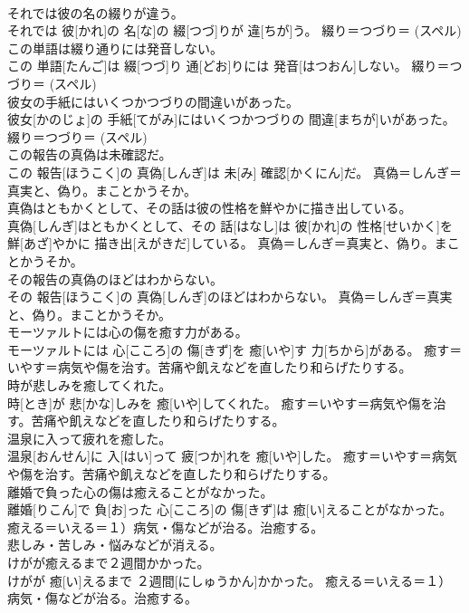 \documentclass[8pt]{extreport}
\begin{document}
\begin{CJK}{UTF8}{min}
{\\	それでは彼の名の綴りが違う。	
\\	それでは 彼[かれ]の 名[な]の 綴[つづ]りが 違[ちが]う。	綴り＝つづり＝ (スペル) 
\\	この単語は綴り通りには発音しない。	
\\	この 単語[たんご]は 綴[つづ]り 通[どお]りには 発音[はつおん]しない。	綴り＝つづり＝ (スペル) 
\\	彼女の手紙にはいくつかつづりの間違いがあった。	
\\	彼女[かのじょ]の 手紙[てがみ]にはいくつかつづりの 間違[まちが]いがあった。	綴り＝つづり＝ (スペル) 
\\	この報告の真偽は未確認だ。	
\\	この 報告[ほうこく]の 真偽[しんぎ]は 未[み] 確認[かくにん]だ。	真偽＝しんぎ＝真実と、偽り。まことかうそか。
\\	真偽はともかくとして、その話は彼の性格を鮮やかに描き出している。	
\\	真偽[しんぎ]はともかくとして、その 話[はなし]は 彼[かれ]の 性格[せいかく]を 鮮[あざ]やかに 描き出[えがきだ]している。	真偽＝しんぎ＝真実と、偽り。まことかうそか。
\\	その報告の真偽のほどはわからない。	
\\	その 報告[ほうこく]の 真偽[しんぎ]のほどはわからない。	真偽＝しんぎ＝真実と、偽り。まことかうそか。
\\	モーツァルトには心の傷を癒す力がある。	
\\	モーツァルトには 心[こころ]の 傷[きず]を 癒[いや]す 力[ちから]がある。	癒す＝いやす＝病気や傷を治す。苦痛や飢えなどを直したり和らげたりする。
\\	時が悲しみを癒してくれた。	
\\	時[とき]が 悲[かな]しみを 癒[いや]してくれた。	癒す＝いやす＝病気や傷を治す。苦痛や飢えなどを直したり和らげたりする。
\\	温泉に入って疲れを癒した。	
\\	温泉[おんせん]に 入[はい]って 疲[つか]れを 癒[いや]した。	癒す＝いやす＝病気や傷を治す。苦痛や飢えなどを直したり和らげたりする。
\\	離婚で負った心の傷は癒えることがなかった。	
\\	離婚[りこん]で 負[お]った 心[こころ]の 傷[きず]は 癒[い]えることがなかった。	癒える＝いえる＝１）病気・傷などが治る。治癒する。 　　　　　　　　
\\	悲しみ・苦しみ・悩みなどが消える。
\\	けがが癒えるまで２週間かかった。	
\\	けがが 癒[い]えるまで ２週間[にしゅうかん]かかった。	癒える＝いえる＝１）病気・傷などが治る。治癒する。 　　　　　　　　
}
\end{CJK}
\end{document}

